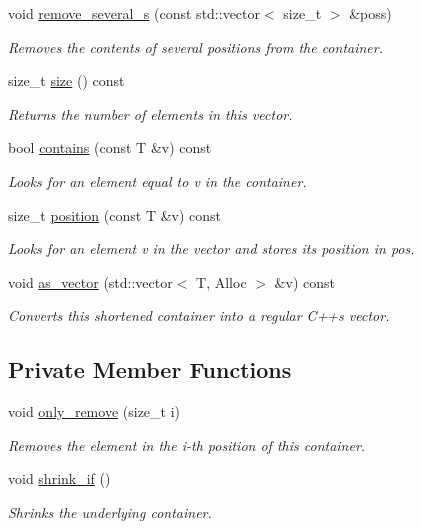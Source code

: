 \begin{DoxyCompactItemize}
void \hyperlink{classlgraph_1_1utils_1_1svector_a2b3c8a4fcd5234fbe2e05bb36d406b01}{remove\+\_\+several\+\_\+s} (const std\+::vector$<$ size\+\_\+t $>$ \&poss)
\begin{DoxyCompactList}\small\item\em Removes the contents of several positions from the container. \end{DoxyCompactList}\item 
size\+\_\+t \hyperlink{classlgraph_1_1utils_1_1svector_af099aed6d134ad4c934be1339e4cf98c}{size} () const
\begin{DoxyCompactList}\small\item\em Returns the number of elements in this vector. \end{DoxyCompactList}\item 
bool \hyperlink{classlgraph_1_1utils_1_1svector_a363a3c9cee98869619b855342bc5c803}{contains} (const T \&v) const
\begin{DoxyCompactList}\small\item\em Looks for an element equal to {\itshape v} in the container. \end{DoxyCompactList}\item 
size\+\_\+t \hyperlink{classlgraph_1_1utils_1_1svector_a3d1e4cc50553983c7e791779fee9b2fe}{position} (const T \&v) const
\begin{DoxyCompactList}\small\item\em Looks for an element {\itshape v} in the vector and stores its position in {\itshape pos}. \end{DoxyCompactList}\item 
void \hyperlink{classlgraph_1_1utils_1_1svector_a443b6585d588bbc8de631ddeb1abfc58}{as\+\_\+vector} (std\+::vector$<$ T, Alloc $>$ \&v) const
\begin{DoxyCompactList}\small\item\em Converts this shortened container into a regular C++\textquotesingle{}s vector. \end{DoxyCompactList}\end{DoxyCompactItemize}
\subsection*{Private Member Functions}
\begin{DoxyCompactItemize}
\item 
void \hyperlink{classlgraph_1_1utils_1_1svector_afd0bed68cf8eb4c07c8553c555fb2f3b}{only\+\_\+remove} (size\+\_\+t i)
\begin{DoxyCompactList}\small\item\em Removes the element in the i-\/th position of this container. \end{DoxyCompactList}\item 
void \hyperlink{classlgraph_1_1utils_1_1svector_af9d5e3d01e8cf40b13494d699a7f2eef}{shrink\+\_\+if} ()
\begin{DoxyCompactList}\small\item\em Shrinks the underlying container. \end{DoxyCompactList}\end{DoxyCompactItemize}
